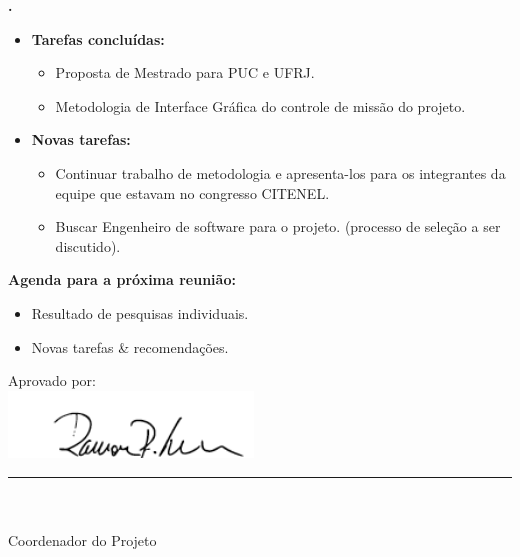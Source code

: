 			
   \textbf{\julia.} 
	\begin{itemize}
		\item \textbf{Tarefas concluídas:}
			\begin{itemize}    
				\item Proposta de Mestrado para PUC e UFRJ.
				\item Metodologia de Interface Gráfica do controle de missão do projeto.
			\end{itemize}
		
		\item \textbf{Novas tarefas:}
			\begin{itemize} 
			    \item Continuar trabalho de metodologia e apresenta-los para os
			    integrantes da equipe que estavam no congresso CITENEL.
			    \item Buscar Engenheiro de software para o projeto. (processo de
			    seleção a ser discutido).
			\end{itemize}
	\end{itemize}		



\textbf{Agenda para a próxima reunião:}
  \begin{itemize}
    \item Resultado de pesquisas individuais.
    \item Novas tarefas \& recomendações.
  \end{itemize}


\vspace{5mm}%
\parbox[t]{70mm}{
  Aprovado por: \\[5mm]
  \centering
  \includegraphics[width=65mm]{figs/logo/assinatura-ramon.png} \\[-4mm]
  \rule[2mm]{70mm}{0.1mm} \\
  \ramon \\[1mm]
  Coordenador do Projeto \\
}

\fim